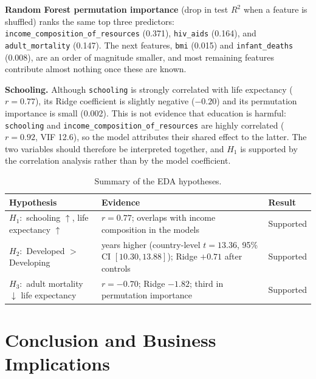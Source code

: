 \documentclass[12pt,a4paper]{article}
\begin{document}
\textbf{Random Forest permutation importance} (drop in test $R^2$ when a feature is shuffled)
ranks the same top three predictors: \texttt{income\_composition\_of\_resources} (0.371),
\texttt{hiv\_aids} (0.164), and \texttt{adult\_mortality} (0.147). The next features,
\texttt{bmi} (0.015) and \texttt{infant\_deaths} (0.008), are an order of magnitude smaller, and
most remaining features contribute almost nothing once these are known.

\textbf{Schooling.} Although \texttt{schooling} is strongly correlated with life expectancy
($r=0.77$), its Ridge coefficient is slightly negative ($-0.20$) and its permutation importance is
small (0.002). This is not evidence that education is harmful: \texttt{schooling} and
\texttt{income\_composition\_of\_resources} are highly correlated ($r=0.92$, VIF 12.6), so the model
attributes their shared effect to the latter. The two variables should therefore be interpreted
together, and $H_1$ is supported by the correlation analysis rather than by the model coefficient.

\begin{table}[H]\centering
\caption{Summary of the EDA hypotheses.}
\setlength{\tabcolsep}{8pt}
\begin{tabularx}{\textwidth}{l >{\raggedright\arraybackslash}X l}\toprule
\textbf{Hypothesis} & \textbf{Evidence} & \textbf{Result}\\\midrule
$H_1:$ schooling $\uparrow$, life expectancy $\uparrow$ & $r=0.77$; overlaps with income composition in the models & Supported\\
$H_2:$ Developed $>$ Developing & 12.09 years higher (country-level $t=13.36$, 95\% CI $[10.30, 13.88]$); Ridge $+0.71$ after controls & Supported\\
$H_3:$ adult mortality $\downarrow$ life expectancy & $r=-0.70$; Ridge $-1.82$; third in permutation importance & Supported\\\bottomrule
\end{tabularx}\end{table}

\section{Conclusion and Business Implications}
\end{document}
